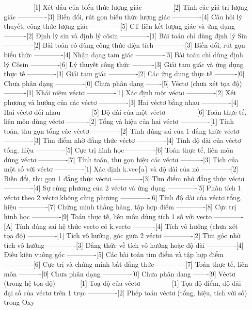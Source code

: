 -------------[1] Xét dấu của biểu thức lượng giác
-------------[2] Tính các giá trị lượng giác
-------------[3] Biến đổi, rút gọn biểu thức lượng giác
-------------[4] Câu hỏi lý thuyết, công thức lượng giác
-------------[5] CT liên kết lượng giác và ứng dụng
----------[2] Định lý sin và định lý côsin
-------------[1] Bài toán chỉ dùng định lý Sin 
-------------[2] Bài toán có dùng công thức diện tích
-------------[3] Biến đổi, rút gọn biểu thức
-------------[4] Nhận dạng tam giác
-------------[5] Bài toán chỉ dùng định lý Côsin
-------------[6] Lý thuyết công thức
----------[3] Giải tam giác và ứng dụng thực tế
-------------[1] Giải tam giác
-------------[2] Các ứng dụng thực tế
----------[0] Chưa phân dạng
-------------[0] Chưa phân dạng
-------[5] Véctơ (chưa xét tọa độ)
----------[1] Khái niệm véctơ
-------------[1] Xác định một véctơ
-------------[2] Xét phương và hướng của các véctơ
-------------[3] Hai véctơ bằng nhau
-------------[4] Hai véctơ đối nhau
-------------[5] Độ dài của một véctơ
-------------[6] Toán thực tế, liên môn dùng véctơ
----------[2] Tổng và hiệu của hai véctơ
-------------[1] Tính toán, thu gọn tổng các véctơ
-------------[2] Tính đúng-sai của 1 đẳng thức véctơ
-------------[3] Tìm điểm nhờ đẳng thức véctơ
-------------[4] Tính độ dài của véctơ tổng, hiệu
-------------[5] Cực trị hình học
-------------[6] Toán thực tế, liên môn dùng véctơ
-------------[7] Tính toán, thu gọn hiệu các véctơ
----------[3] Tích của một số với véctơ
-------------[1] Xác định k.vec\{a\} và độ dài của nó
-------------[2] Biến đổi, thu gọn 1 đẳng thức véctơ
-------------[3] Tìm điểm nhờ đẳng thức véctơ
-------------[4] Sự cùng phương của 2 véctơ và ứng dụng
-------------[5] Phân tích 1 véctơ theo 2 véctơ không cùng phương
-------------[6] Tính độ dài của véctơ tổng, hiệu
-------------[7] Chứng minh thẳng hàng, tập hợp điểm
-------------[8] Cực trị hình học
-------------[9] Toán thực tế, liên môn dùng tích 1 số với vecto
-------------[A] Tính đúng sai hệ thức vecto có k.vecto
----------[4] Tích vô hướng (chưa xét tọa độ)
-------------[1] Tích vô hướng, góc giữa 2 véctơ
-------------[2] Tìm góc nhờ tích vô hướng
-------------[3] Đẳng thức về tích vô hướng hoặc độ dài
-------------[4] Điều kiện vuông góc
-------------[5] Các bài toán tìm điểm và tập hợp điểm
-------------[6] Cực trị và chứng minh bất đẳng thức
-------------[7] Toán thực tế, liên môn
----------[0] Chưa phân dạng
-------------[0] Chưa phân dạng
-------[9] Véctơ (trong hệ tọa độ)
----------[1] Toạ độ của véctơ
-------------[1] Tọa độ điểm, độ dài đại số của véctơ trên 1 trục
-------------[2] Phép toán véctơ (tổng, hiệu, tích với số) trong Oxy
